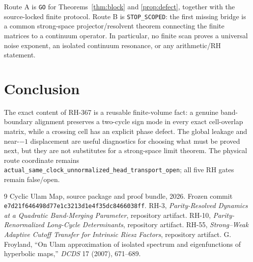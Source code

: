 \documentclass[11pt]{article}
\theoremstyle{definition}
\theoremstyle{remark}
\begin{document}
Route A is \texttt{GO} for Theorems~\ref{thm:block} and
\ref{prop:defect}, together with the source-locked finite protocol.  Route B
is \texttt{STOP\_SCOPED}: the first missing bridge is a common strong-space
projector/resolvent theorem connecting the finite matrices to a continuum
operator.  In particular, no finite scan proves a universal noise exponent,
an isolated continuum resonance, or any arithmetic/RH statement.

\section{Conclusion}

The exact content of RH-367 is a reusable finite-volume fact: a genuine
band-boundary alignment preserves a two-cycle sign mode in every exact
cell-overlap matrix, while a crossing cell has an explicit phase defect.  The
global leakage and near-$-1$ displacement are useful diagnostics for choosing
what must be proved next, but they are not substitutes for a strong-space
limit theorem.  The physical route coordinate remains
\texttt{actual\_same\_clock\_unnormalized\_head\_transport\_open}; all five
RH gates remain false/open.

\begingroup\raggedright
\begin{thebibliography}{9}
  Cyclic Ulam Map, source package and proof bundle, 2026.  Frozen commit
  \texttt{e7d21f646498d77e1c3213d1e4f35dc8466038ff}.
  RH-3, \emph{Parity-Resolved Dynamics at a Quadratic Band-Merging
  Parameter}, repository artifact.
  RH-10, \emph{Parity-Renormalized Long-Cycle Determinants}, repository
  artifact.
  RH-55, \emph{Strong--Weak Adaptive Cutoff Transfer for Intrinsic Riesz
  Factors}, repository artifact.
  G. Froyland, ``On Ulam approximation of isolated spectrum and
  eigenfunctions of hyperbolic maps,'' \emph{DCDS} 17 (2007), 671--689.
\end{thebibliography}
\endgroup
\end{document}
